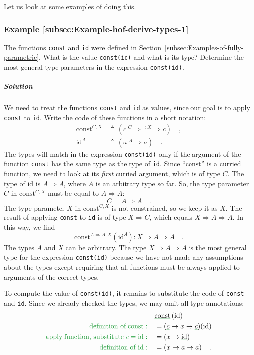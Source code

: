 Let us look at some examples of doing this.

\subsubsection{Example \label{subsec:Example-hof-derive-types-1}\ref{subsec:Example-hof-derive-types-1}}

The functions \lstinline!const! and \lstinline!id! were defined
in Section~\ref{subsec:Examples-of-fully-parametric}. What is the
value \lstinline!const(id)! and what is its type? Determine the most
general type parameters in the expression \lstinline!const(id)!.

\subparagraph{Solution}

We need to treat the functions \lstinline!const! and \lstinline!id!
as values, since our goal is to apply \lstinline!const! to \lstinline!id!.
Write the code of these functions in a short notation:
\begin{align*}
\text{const}^{C,X} & \triangleq(c^{:C}\Rightarrow\_^{:X}\Rightarrow c)\quad,\\
\text{id}^{A} & \triangleq(a^{:A}\Rightarrow a)\quad.
\end{align*}
The types will match in the expression \lstinline!const(id)! only
if the argument of the function \lstinline!const! has the same type
as the type of \lstinline!id!. Since ``$\text{const}$'' is a curried
function, we need to look at its \emph{first} curried argument, which
is of type $C$. The type of $\text{id}$ is $A\Rightarrow A$, where
$A$ is an arbitrary type so far. So, the type parameter $C$ in $\text{const}^{C,X}$
must be equal to $A\Rightarrow A$:
\[
C=A\Rightarrow A\quad.
\]
 The type parameter $X$ in $\text{const}^{C,X}$ is not constrained,
so we keep it as $X$. The result of applying \lstinline!const! to
\lstinline!id! is of type $X\Rightarrow C$, which equals $X\Rightarrow A\Rightarrow A$.
In this way, we find 
\[
\text{const}^{A\Rightarrow A,X}(\text{id}^{A}):X\Rightarrow A\Rightarrow A\quad.
\]
The types $A$ and $X$ can be arbitrary. The type $X\Rightarrow A\Rightarrow A$
is the most general type for the expression \lstinline!const(id)!
because we have not made any assumptions about the types except requiring
that all functions must be always applied to arguments of the correct
types.

To compute the value of \lstinline!const(id)!, it remains to substitute
the code of \lstinline!const! and \lstinline!id!. Since we already
checked the types, we may omit all type annotations:
\begin{align*}
 & \gunderline{\text{const}}\left(\text{id}\right)\\
{\color{greenunder}\text{definition of const}:}\quad & =(\gunderline c\Rightarrow x\Rightarrow\gunderline c)(\text{id})\\
{\color{greenunder}\text{apply function, substitute }c=\text{id}:}\quad & =(x\Rightarrow\gunderline{\text{id}})\\
{\color{greenunder}\text{definition of }\text{id}:}\quad & =\left(x\Rightarrow a\Rightarrow a\right)\quad.
\end{align*}

